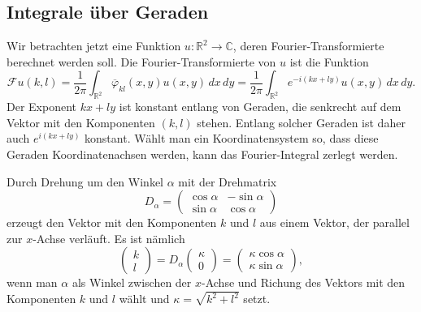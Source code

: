 %
%
\subsection{Integrale über Geraden
\label{buch:radon:definition:subsection:geraden}}
Wir betrachten jetzt eine Funktion $u\colon \mathbb{R}^2\to\mathbb{C}$,
deren Fourier-Transformierte berechnet werden soll.
Die Fourier-Transformierte von $u$ ist die Funktion
\[
\mathscr{F}u(k,l)
=
\frac{1}{2\pi}
\int_{\mathbb{R}^2}
\overline{\varphi}_{kl}(x,y)
u(x,y)
\,dx\,dy
=
\frac{1}{2\pi}
\int_{\mathbb{R}^2}
e^{-i(kx+ly)}
u(x,y)
\,dx\,dy.
\]
Der Exponent $kx+ly$ ist konstant entlang von Geraden, die
senkrecht auf dem Vektor mit den Komponenten $(k,l)$ stehen.
Entlang solcher Geraden ist daher auch $e^{i(kx+ly)}$ konstant.
Wählt man ein Koordinatensystem so, dass diese Geraden
Koordinatenachsen werden, kann das Fourier-Integral zerlegt werden.

Durch Drehung um den Winkel $\alpha$ mit der Drehmatrix
\[
D_\alpha
=
\begin{pmatrix*}
\cos\alpha&-\sin\alpha\\
\sin\alpha& \cos\alpha
\end{pmatrix*}
\]
erzeugt den Vektor mit den Komponenten $k$ und $l$ aus einem
Vektor, der parallel zur $x$-Achse verläuft.
Es ist nämlich
\[
\begin{pmatrix}k\\l\end{pmatrix}
=
D_\alpha
\begin{pmatrix}\kappa\\0\end{pmatrix}
=
\begin{pmatrix}
\kappa\cos\alpha\\
\kappa\sin\alpha
\end{pmatrix},
\]
wenn man $\alpha$ als Winkel zwischen der $x$-Achse und Richung
des Vektors mit den Komponenten $k$ und $l$ wählt und
$\kappa=\sqrt{k^2+l^2}$ setzt.

